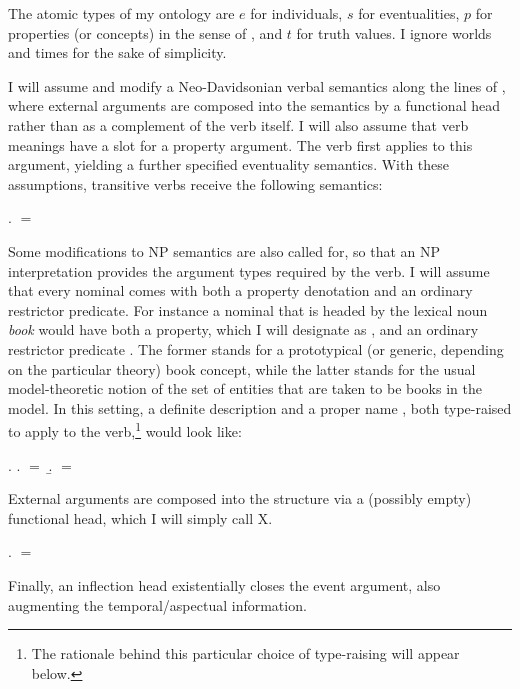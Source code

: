 \documentclass[11pt,a4paper]{article}
\begin{document}
The atomic types of my ontology are $e$ for individuals, $s$ for eventualities,
$p$ for properties (or concepts) in the sense of , and $t$ for
truth values. I ignore worlds and times for the sake of simplicity.

I will assume and modify a Neo-Davidsonian verbal semantics along the lines of
\cite{kratzer96}, where external arguments are composed into the semantics by a
functional head rather than as a complement of the verb itself. I will also
assume that verb meanings have a slot for a property argument. The verb first
applies to this argument, yielding a further specified eventuality semantics.
With these assumptions, transitive verbs receive the following semantics:

\ex.  $=$ 

Some modifications to NP semantics are also called for, so that an NP
interpretation provides the argument types required by the verb. I will assume
that every nominal comes with both a property denotation and an ordinary
restrictor predicate. For instance a nominal that is headed by the lexical noun
\emph{book} would have both a property, which I will designate as ,
and an ordinary restrictor predicate . The former stands for a
prototypical (or generic, depending on the particular theory) book concept,
while the latter stands for the usual model-theoretic notion of the set of
entities that are taken to be books in the model. In this setting, a definite
description  and a proper name , both
type-raised to apply to the verb,\footnote{The rationale behind this particular
choice of type-raising will appear below.} would look like:

\ex.\label{exdefprov}
\a.
 $=$  
\b.
 $=$  

External arguments are composed into the structure via a (possibly empty)
functional head, which I will simply call X.

\ex.  $=$ 

Finally, an inflection head existentially closes the event argument, also
augmenting the temporal/aspectual information.
\end{document}
